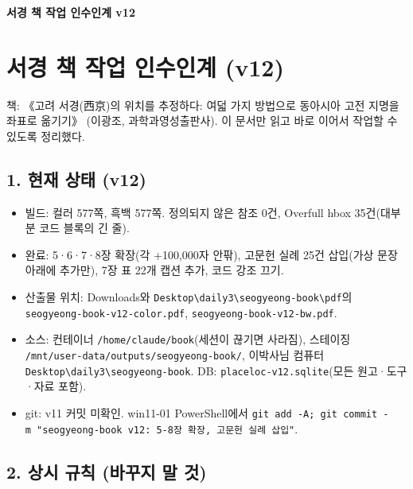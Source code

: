 \documentclass[10pt,a4paper]{article}
\providecommand{\tightlist}{\setlength{\itemsep}{0pt}\setlength{\parskip}{0pt}}
\begin{document}
\begin{center}{\LARGE\bfseries 서경 책 작업 인수인계 v12}\end{center}
\hypertarget{uxc11cuxacbd-uxcc45-uxc791uxc5c5-uxc778uxc218uxc778uxacc4-v12}{%
\section{서경 책 작업 인수인계 (v12)}\label{uxc11cuxacbd-uxcc45-uxc791uxc5c5-uxc778uxc218uxc778uxacc4-v12}}

책: 《고려 서경(西京)의 위치를 추정하다: 여덟 가지 방법으로 동아시아 고전 지명을 좌표로 옮기기》 (이광조, 과학과영성출판사). 이 문서만 읽고 바로 이어서 작업할 수 있도록 정리했다.

\hypertarget{uxd604uxc7ac-uxc0c1uxd0dc-v12}{%
\subsection{1. 현재 상태 (v12)}\label{uxd604uxc7ac-uxc0c1uxd0dc-v12}}

\begin{itemize}
\tightlist
\item
  빌드: 컬러 577쪽, 흑백 577쪽. 정의되지 않은 참조 0건, Overfull hbox 35건(대부분 코드 블록의 긴 줄).
\item
  완료: 5·6·7·8장 확장(각 +100,000자 안팎), 고문헌 실례 25건 삽입(가상 문장 아래에 추가만), 7장 표 22개 캡션 추가, 코드 강조 끄기.
\item
  산출물 위치: Downloads와 \texttt{Desktop\textbackslash{}daily3\textbackslash{}seogyeong-book\textbackslash{}pdf}의 \texttt{seogyeong-book-v12-color.pdf}, \texttt{seogyeong-book-v12-bw.pdf}.
\item
  소스: 컨테이너 \texttt{/home/claude/book}(세션이 끊기면 사라짐), 스테이징 \texttt{/mnt/user-data/outputs/seogyeong-book/}, 이박사님 컴퓨터 \texttt{Desktop\textbackslash{}daily3\textbackslash{}seogyeong-book}. DB: \texttt{placeloc-v12.sqlite}(모든 원고·도구·자료 포함).
\item
  git: v11 커밋 미확인. win11-01 PowerShell에서 \texttt{git\ add\ -A;\ git\ commit\ -m\ "seogyeong-book\ v12:\ 5-8장\ 확장,\ 고문헌\ 실례\ 삽입"}.
\end{itemize}

\hypertarget{uxc0c1uxc2dc-uxaddcuxce59-uxbc14uxafb8uxc9c0-uxb9d0-uxac83}{%
\subsection{2. 상시 규칙 (바꾸지 말 것)}\label{uxc0c1uxc2dc-uxaddcuxce59-uxbc14uxafb8uxc9c0-uxb9d0-uxac83}}
\end{document}
